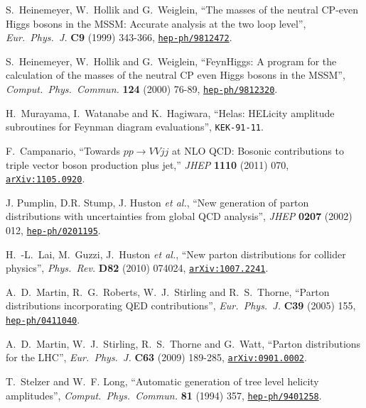 \documentclass[english,12pt]{article}
\begin{document}
\begin{thebibliography}{10}
  S.~Heinemeyer, W.~Hollik and G.~Weiglein,
  ``The masses of the neutral CP-even Higgs bosons in the MSSM: Accurate analysis at the two loop level'',
  {\em Eur.\ Phys.\ J.} {\bf C9} (1999)  343-366,
\href{http://www.arXiv.org/abs/hep-ph/9812472}{{\tt hep-ph/9812472}}.

  S.~Heinemeyer, W.~Hollik and G.~Weiglein,
  ``FeynHiggs: A program for the calculation of the masses of the neutral CP even Higgs bosons in the MSSM'',
  {\em Comput.\ Phys.\ Commun.}  {\bf 124} (2000)  76-89,
\href{http://www.arXiv.org/abs/hep-ph/9812320}{{\tt hep-ph/9812320}}.

H.~Murayama, I.~Watanabe and K.~Hagiwara, ``Helas: HELicity amplitude
  subroutines for Feynman diagram evaluations'', {\tt KEK-91-11}.

  F.~Campanario,
  ``Towards $pp \rightarrow VVjj$ at NLO QCD: Bosonic contributions to triple vector boson production plus jet,''
  {\em JHEP} {\bf 1110} (2011) 070,
  \href{http://www.arXiv.org/abs/1105.0920}{{\tt arXiv:1105.0920}}.

J. Pumplin, D.R. Stump, J. Huston {\em et al.}, ``New generation of parton distributions with
  uncertainties from global QCD analysis'', {\em JHEP} {\bf 0207} (2002) 012,
\href{http://www.arXiv.org/abs/hep-ph/0201195}{{\tt hep-ph/0201195}}.

  H.~-L.~Lai, M.~Guzzi, J.~Huston {\it et al.},
  ``New parton distributions for collider physics'',
  {\em Phys.\ Rev.}  {\bf D82} (2010)  074024,
\href{http://www.arXiv.org/abs/1007.2241}{{\tt arXiv:1007.2241}}.

  A.~D.~Martin, R.~G.~Roberts, W.~J.~Stirling and R.~S.~Thorne,
  ``Parton distributions incorporating QED contributions'',
  {\em Eur.\ Phys.\ J.} {\bf C39} (2005) 155,
\href{http://www.arXiv.org/abs/hep-ph/0411040}{{\tt hep-ph/0411040}}.

  A.~D.~Martin, W.~J.~Stirling, R.~S.~Thorne and G.~Watt,
  ``Parton distributions for the LHC'',
  {\em Eur.\ Phys.\ J.} {\bf C63} (2009)  189-285,
  \href{http://arxiv.org/abs/0901.0002}{{\tt arXiv:0901.0002}}.

T.~Stelzer and W.~F. Long, ``{Automatic generation of tree level helicity
  amplitudes}'', {\em Comput.\ Phys.\ Commun.} {\bf 81} (1994) 357,
\href{http://www.arXiv.org/abs/hep-ph/9401258}{{\tt hep-ph/9401258}}.


\end{thebibliography}
\end{document}
